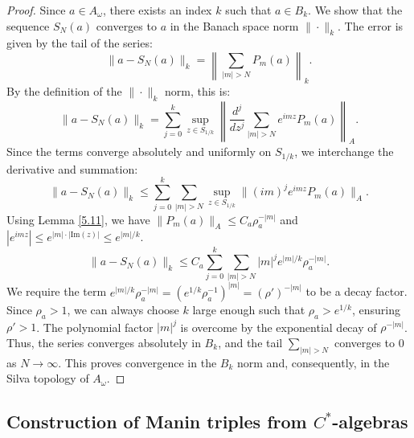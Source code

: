 \documentclass[11pt,reqno]{amsart}
\theoremstyle{definition}
\numberwithin{equation}{section}
\begin{document}
\begin{proof}
Since $a \in A_{\omega}$, there exists an index $k$ such that $a \in B_k$. We show that the sequence $S_N(a)$ converges to $a$ in the Banach space norm $\| \cdot \|_k$. The error is given by the tail of the series:
\[
\|a - S_N(a)\|_k = \left\| \sum_{|m| > N} P_m(a) \right\|_k.
\]
By the definition of the $\| \cdot \|_k$ norm, this is:
\[
\|a - S_N(a)\|_k = \sum_{j=0}^k \sup_{z \in S_{1/k}} \left\| \frac{d^j}{dz^j} \sum_{|m| > N} e^{imz}P_m(a) \right\|_A.
\]
Since the terms converge absolutely and uniformly on $S_{1/k}$, we interchange the derivative and summation:
\[
\|a - S_N(a)\|_k \le \sum_{j=0}^k \sum_{|m| > N} \sup_{z \in S_{1/k}} \| (im)^j e^{imz} P_m(a) \|_A.
\]
Using Lemma \ref{5.11}, we have $\|P_m(a)\|_A \le C_a \rho_a^{-|m|}$ and $|e^{imz}| \le e^{|m| \cdot |\text{Im}(z)|} \le e^{|m|/k}$.
\[
\|a - S_N(a)\|_k \le C_a \sum_{j=0}^k \sum_{|m| > N} |m|^j e^{|m|/k} \rho_a^{-|m|}.
\]
We require the term $e^{|m|/k}\rho_a^{-|m|} = (e^{1/k}\rho_a^{-1})^{|m|} = (\rho')^{-|m|}$ to be a decay factor. Since $\rho_a > 1$, we can always choose $k$ large enough such that $\rho_a > e^{1/k}$, ensuring $\rho' > 1$. The polynomial factor $|m|^j$ is overcome by the exponential decay of $\rho^{-|m|}$. Thus, the series converges absolutely in $B_k$, and the tail $\sum_{|m| > N}$ converges to 0 as $N \rightarrow \infty$. This proves convergence in the $B_k$ norm and, consequently, in the Silva topology of $A_{\omega}$.
\end{proof}


\subsection{Construction of Manin triples from $C^*$-algebras}\label{Construction of Manin triples from $C^*$-algebras}
\end{document}
